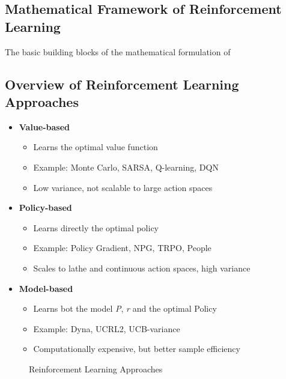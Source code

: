 \subsection{Mathematical Framework of Reinforcement Learning}

The basic building blocks of the mathematical formulation of


\subsection{Overview of Reinforcement Learning Approaches}
\begin{itemize}
\item \textbf{Value-based}
    \begin{itemize}
        \item Learns the optimal value function
        \item Example: Monte Carlo, SARSA, Q-learning, DQN
        \item \bred Low variance, not scalable to large action spaces \ered
    \end{itemize}
\item \textbf{Policy-based}
    \begin{itemize}
        \item Learns directly the optimal policy
        \item Example: Policy Gradient, NPG, TRPO, People
        \item \bred Scales to lathe and continuous action spaces, high variance \ered
    \end{itemize}
\item \textbf{Model-based}
    \begin{itemize}
        \item Learns bot the model \textit{P}, \textit{r} and the optimal Policy
        \item Example: Dyna, UCRL2, UCB-variance
        \item \bred Computationally expensive, but better sample efficiency \ered
    \end{itemize}
\end{itemize}

\begin{figure}
    \centering
    \caption{Reinforcement Learning Approaches}
    \label{fig:rl-approaches}
\end{figure}
